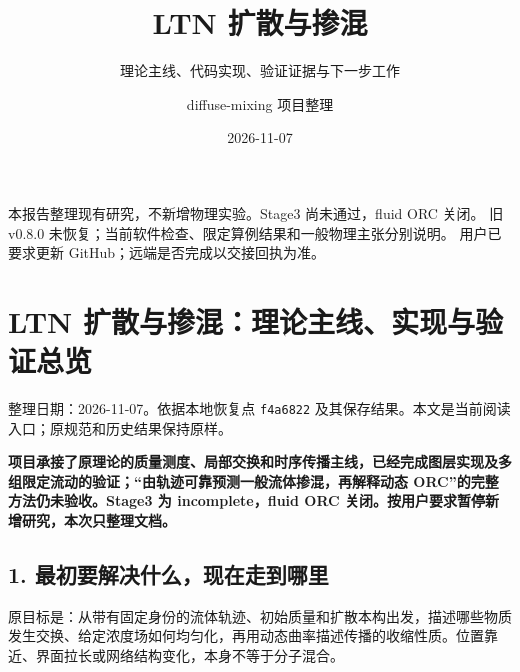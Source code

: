 \documentclass[
  10pt,
  a4paper,
]{article}
\title{LTN 扩散与掺混}
\subtitle{理论主线、代码实现、验证证据与下一步工作}
\author{diffuse-mixing 项目整理}
\date{2026-11-07}
\begin{document}
\maketitle

\renewcommand*\contentsname{目录}
{
\hypersetup{linkcolor=}
\setcounter{tocdepth}{2}
\tableofcontents
}
本报告整理现有研究，不新增物理实验。Stage3 尚未通过，fluid ORC 关闭。 旧
v0.8.0 未恢复；当前软件检查、限定算例结果和一般物理主张分别说明。
用户已要求更新 GitHub；远端是否完成以交接回执为准。

\newpage

\section{LTN
扩散与掺混：理论主线、实现与验证总览}\label{ltn-ux6269ux6563ux4e0eux63baux6df7ux7406ux8bbaux4e3bux7ebfux5b9eux73b0ux4e0eux9a8cux8bc1ux603bux89c8}

整理日期：2026-11-07。依据本地恢复点 \nolinkurl{f4a6822}
及其保存结果。本文是当前阅读入口；原规范和历史结果保持原样。

\textbf{项目承接了原理论的质量测度、局部交换和时序传播主线，已经完成图层实现及多组限定流动的验证；``由轨迹可靠预测一般流体掺混，再解释动态
ORC''的完整方法仍未验收。Stage3 为 incomplete，fluid ORC
关闭。按用户要求暂停新增研究，本次只整理文档。}

\subsection{1.
最初要解决什么，现在走到哪里}\label{ux6700ux521dux8981ux89e3ux51b3ux4ec0ux4e48ux73b0ux5728ux8d70ux5230ux54eaux91cc}

原目标是：从带有固定身份的流体轨迹、初始质量和扩散本构出发，描述哪些物质发生交换、给定浓度场如何均匀化，再用动态曲率描述传播的收缩性质。位置靠近、界面拉长或网络结构变化，本身不等于分子混合。

\begin{center}
\end{center}
\end{document}
